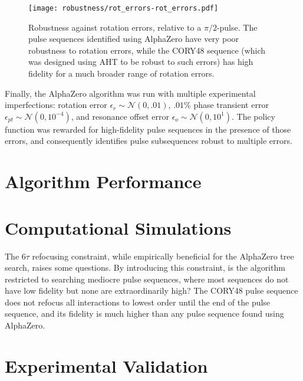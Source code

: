 \begin{figure}[H]
    \centering
    \texttt{[image: robustness/rot\_errors-rot\_errors.pdf]}
    \caption{Robustness against rotation errors, relative to a $\pi/2$-pulse. The pulse sequences identified using AlphaZero have very poor robustness to rotation errors, while the CORY48 sequence (which was designed using AHT to be robust to such errors) has high fidelity for a much broader range of rotation errors.
    }
    \label{fig:rot_errors-rot_errors}
\end{figure}


Finally, the AlphaZero algorithm was run with multiple experimental imperfections: rotation error $\epsilon_r \sim \mathcal{N}(0, .01)$, $.01\%$ phase transient error $\epsilon_{pt} \sim \mathcal{N}(0, 10^{-4})$, and resonance offset error $\epsilon_o \sim \mathcal{N}(0, 10^1)$.
The policy function was rewarded for high-fidelity pulse sequences in the presence of those errors, and consequently identifies pulse subsequences robust to multiple errors.






\section{Algorithm Performance}



\section{Computational Simulations}





The $6\tau$ refocusing constraint, while empirically beneficial for the AlphaZero tree search, raises some questions. By introducing this constraint, is the algorithm restricted to searching mediocre pulse sequences, where most sequences do not have low fidelity but none are extraordinarily high? The CORY48 pulse sequence does not refocus all interactions to lowest order until the end of the pulse sequence, and its fidelity is much higher than any pulse sequence found using AlphaZero.




\section{Experimental Validation}


